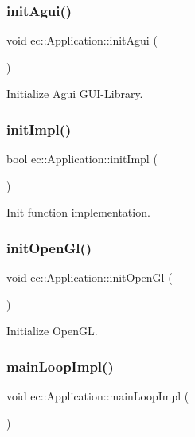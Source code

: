 \subsubsection{\texorpdfstring{init\+Agui()}{initAgui()}}
{\footnotesize\ttfamily void ec\+::\+Application\+::init\+Agui (\begin{DoxyParamCaption}{ }\end{DoxyParamCaption})}

Initialize Agui G\+U\+I-\/\+Library. \mbox{\label{classec_1_1_application_a1460d7083c312271285747a7cc03f7e8}} 
\subsubsection{\texorpdfstring{init\+Impl()}{initImpl()}}
{\footnotesize\ttfamily bool ec\+::\+Application\+::init\+Impl (\begin{DoxyParamCaption}{ }\end{DoxyParamCaption})\hspace{0.3cm}{\ttfamily [virtual]}}

Init function implementation. \mbox{\label{classec_1_1_application_a8d6ef43e247b541017fa82e001c42995}} 
\subsubsection{\texorpdfstring{init\+Open\+Gl()}{initOpenGl()}}
{\footnotesize\ttfamily void ec\+::\+Application\+::init\+Open\+Gl (\begin{DoxyParamCaption}{ }\end{DoxyParamCaption})}

Initialize Open\+GL. \mbox{\label{classec_1_1_application_ad32692a6e65a00346ab2992eba3a86e7}} 
\subsubsection{\texorpdfstring{main\+Loop\+Impl()}{mainLoopImpl()}}
{\footnotesize\ttfamily void ec\+::\+Application\+::main\+Loop\+Impl (\begin{DoxyParamCaption}{ }\end{DoxyParamCaption})\hspace{0.3cm}{\ttfamily [virtual]}}

